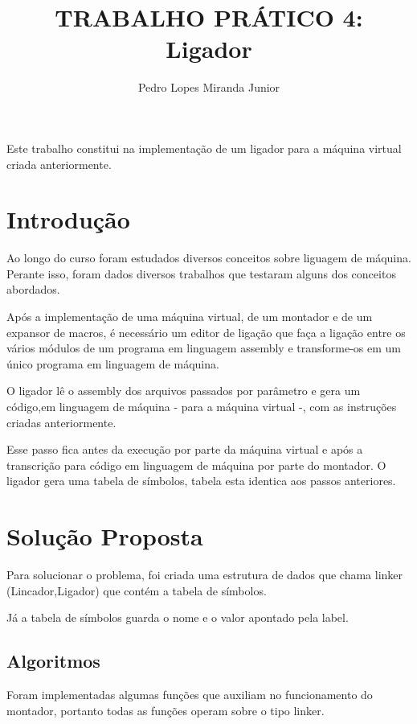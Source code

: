 \documentclass[12pt]{article}
\title{TRABALHO PRÁTICO 4: \\ Ligador}
\author{Pedro Lopes Miranda Junior}
\begin{document}
\maketitle

\begin{resumo} 
Este trabalho constitui na implementação de um ligador para a máquina virtual criada anteriormente.
\end{resumo}

\section{Introdução}
\label{introducao}
Ao longo do curso foram estudados diversos conceitos sobre liguagem de máquina.
Perante isso, foram dados diversos trabalhos que testaram alguns dos conceitos
abordados.

Após a implementação de uma máquina virtual, de um montador e de um expansor de
macros, é necessário um editor de ligação que faça a ligação entre os vários
módulos de um programa em linguagem assembly e transforme-os em um único
programa em linguagem de máquina.

O ligador lê o assembly dos arquivos passados por parâmetro e gera um
código,em linguagem de máquina - para a máquina virtual -, com as instruções
criadas anteriormente.

Esse passo fica antes da execução por parte da máquina virtual e após a
transcrição para código em linguagem de máquina por parte do montador.
O ligador gera uma tabela de símbolos, tabela esta identica aos passos
anteriores.

\section{Solução Proposta}
\label{solucao_proposta}
Para solucionar o problema, foi criada uma estrutura de dados que chama
linker (Lincador,Ligador) que contém a tabela de símbolos.

Já a tabela de símbolos guarda o nome e o valor apontado pela label.

\subsection{Algoritmos}

Foram implementadas algumas funções que auxiliam no funcionamento do montador, 
portanto todas as funções operam sobre o tipo linker.
\end{document}
